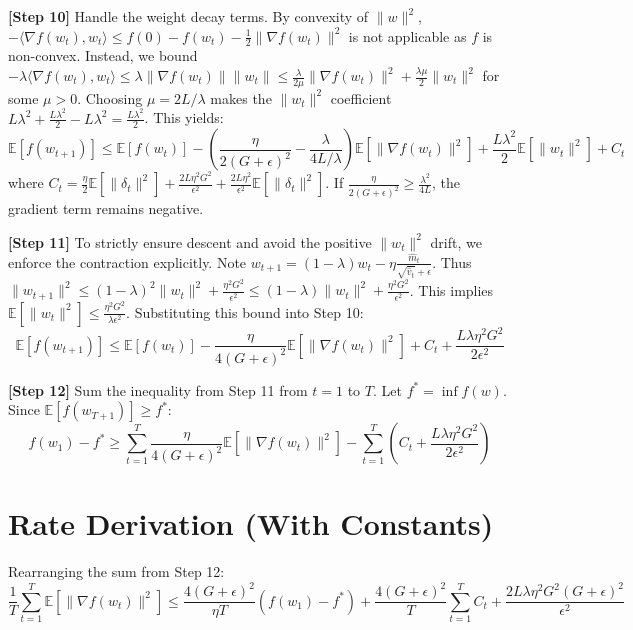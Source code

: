 \documentclass{article}
\begin{document}
\textbf{[Step 10]} Handle the weight decay terms. By convexity of $\|w\|^2$, $-\langle \nabla f(w_t), w_t \rangle \leq f(0) - f(w_t) - \frac{1}{2}\|\nabla f(w_t)\|^2$ is not applicable as $f$ is non-convex. Instead, we bound $-\lambda \langle \nabla f(w_t), w_t \rangle \leq \lambda \|\nabla f(w_t)\| \|w_t\| \leq \frac{\lambda}{2\mu} \|\nabla f(w_t)\|^2 + \frac{\lambda \mu}{2} \|w_t\|^2$ for some $\mu > 0$. Choosing $\mu = 2L/\lambda$ makes the $\|w_t\|^2$ coefficient $L \lambda^2 + \frac{L \lambda^2}{2} - L \lambda^2 = \frac{L\lambda^2}{2}$. This yields:
$$ \mathbb{E}[f(w_{t+1})] \leq \mathbb{E}[f(w_t)] - \left( \frac{\eta}{2(G+\epsilon)^2} - \frac{\lambda}{4L/\lambda} \right) \mathbb{E}[\|\nabla f(w_t)\|^2] + \frac{L\lambda^2}{2} \mathbb{E}[\|w_t\|^2] + C_t $$
where $C_t = \frac{\eta}{2} \mathbb{E}[\|\delta_t\|^2] + \frac{2 L \eta^2 G^2}{\epsilon^2} + \frac{2 L \eta^2}{\epsilon^2} \mathbb{E}[\|\delta_t\|^2]$. If $\frac{\eta}{2(G+\epsilon)^2} \geq \frac{\lambda^2}{4L}$, the gradient term remains negative.

\textbf{[Step 11]} To strictly ensure descent and avoid the positive $\|w_t\|^2$ drift, we enforce the contraction explicitly. Note $w_{t+1} = (1-\lambda)w_t - \eta \frac{\hat{m}_t}{\sqrt{\hat{v}_t}+\epsilon}$. Thus $\|w_{t+1}\|^2 \leq (1-\lambda)^2\|w_t\|^2 + \frac{\eta^2 G^2}{\epsilon^2} \leq (1-\lambda)\|w_t\|^2 + \frac{\eta^2 G^2}{\epsilon^2}$. This implies $\mathbb{E}[\|w_t\|^2] \leq \frac{\eta^2 G^2}{\lambda \epsilon^2}$. Substituting this bound into Step 10:
$$ \mathbb{E}[f(w_{t+1})] \leq \mathbb{E}[f(w_t)] - \frac{\eta}{4(G+\epsilon)^2} \mathbb{E}[\|\nabla f(w_t)\|^2] + C_t + \frac{L \lambda \eta^2 G^2}{2 \epsilon^2} $$

\textbf{[Step 12]} Sum the inequality from Step 11 from $t=1$ to $T$. Let $f^* = \inf f(w)$. Since $\mathbb{E}[f(w_{T+1})] \geq f^*$:
$$ f(w_1) - f^* \geq \sum_{t=1}^T \frac{\eta}{4(G+\epsilon)^2} \mathbb{E}[\|\nabla f(w_t)\|^2] - \sum_{t=1}^T \left( C_t + \frac{L \lambda \eta^2 G^2}{2 \epsilon^2} \right) $$

\section*{Rate Derivation (With Constants)}
Rearranging the sum from Step 12:
$$ \frac{1}{T} \sum_{t=1}^T \mathbb{E}[\|\nabla f(w_t)\|^2] \leq \frac{4(G+\epsilon)^2}{\eta T} (f(w_1) - f^*) + \frac{4(G+\epsilon)^2}{T} \sum_{t=1}^T C_t + \frac{2 L \lambda \eta^2 G^2 (G+\epsilon)^2}{\epsilon^2} $$
\end{document}
